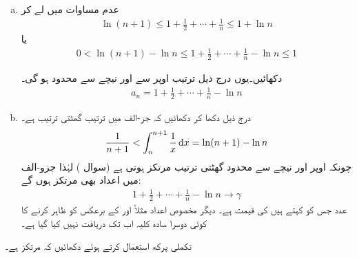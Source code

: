 \begin{enumerate}[a.]
\item
عدم مساوات  میں  لے کر 
\begin{align*}
\ln (n+1)\le 1+\frac{1}{2}+\cdots+\frac{1}{n}\le 1+\ln n
\end{align*}
یا 
\begin{align*}
0<\ln (n+1)-\ln n\le 1+\frac{1}{2}+\cdots+\frac{1}{n}-\ln n\le 1
\end{align*}

دکھائیں۔یوں درج ذیل ترتیب اوپر سے اور نیچے سے محدود ہو گی۔
\begin{align*}
a_n=1+\frac{1}{2}+\cdots+\frac{1}{n}-\ln n
\end{align*}
\item
درج ذیل دکھا کر دکھائیں کہ جز-الف میں ترتیب  گھٹتی ترتیب ہے۔
\begin{align*}
\frac{1}{n+1}<\int_n^{n+1}\frac{1}{x}\dif x=\ln (n+1)-\ln n
\end{align*} 
چونکہ اوپر اور نیچے سے محدود گھٹتی ترتیب مرتکز ہوتی ہے (سوال )  لہٰذا جزو-الف میں اعداد  بھی مرتکز ہوں گے:
\begin{align*}
1+\frac{1}{2}+\cdots+\frac{1}{n}-\ln n\to \gamma
\end{align*}
عدد  جس کو  کہتے ہیں کی قیمت  ہے۔ دیگر مخصوص اعداد مثلاً  اور  کے برعکس  کو ظاہر کرنے کا کوئی دوسرا  سادہ کلیہ اب تک دریافت نہیں کیا گیا ہے۔
\end{enumerate}
تکملی پرکھ استعمال کرتے ہوئے دکھائیں کہ  مرتکز ہے۔
